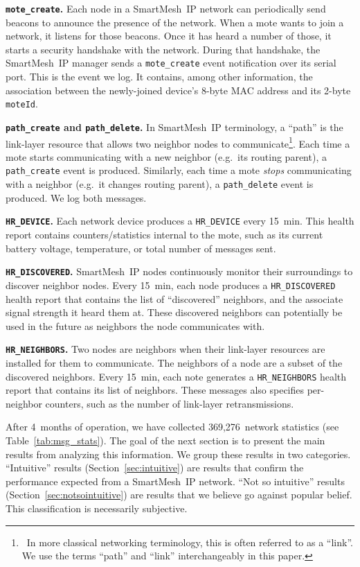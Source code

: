 \documentclass{sig-alternate}
\newcommand{\smip}                {SmartMesh~IP\xspace}
\newcommand{\HRNEIGHBORS}         {{\tt HR\_NEIGHBORS}\xspace}
\newcommand{\HRDISCOVERED}        {{\tt HR\_DISCOVERED}\xspace}
\newcommand{\HRDEVICE}            {{\tt HR\_DEVICE}\xspace}
\newcommand{\pathcreate}          {{\tt path\_create}\xspace}
\newcommand{\pathdelete}          {{\tt path\_delete}\xspace}
\newcommand{\motecreate}          {{\tt mote\_create}\xspace}
\newcommand{\moteId}              {{\tt moteId}\xspace}
\begin{document}
\textbf{\motecreate.}
Each node in a \smip network can periodically send beacons to announce the presence of the network.
When a mote wants to join a network, it listens for those beacons.
Once it has heard a number of those, it starts a security handshake with the network.
During that handshake, the \smip manager sends a \motecreate event notification over its serial port.
This is the event we log.
It contains, among other information, the association between the newly-joined device's 8-byte MAC address and its 2-byte \moteId.

\textbf{\pathcreate and \pathdelete.}
In \smip terminology, a ``path'' is the link-layer resource that allows two neighbor nodes to communicate\footnote{~In more classical networking terminology, this is often referred to as a ``link''. We use the terms ``path'' and ``link'' interchangeably in this paper.}.
Each time a mote starts communicating with a new neighbor (e.g.~its routing parent), a \pathcreate event is produced.
Similarly, each time a mote \textit{stops} communicating with a neighbor (e.g.~it changes routing parent), a \pathdelete event is produced.
We log both messages.

\textbf{\HRDEVICE.}
Each network device produces a \HRDEVICE every 15~min.
This health report contains counters/statistics internal to the mote, such as its current battery voltage, temperature, or total number of messages sent.

\textbf{\HRDISCOVERED.}
\smip nodes continuously monitor their surroundings to discover neighbor nodes.
Every 15~min, each node produces a \HRDISCOVERED health report that contains the list of ``discovered'' neighbors, and the associate signal strength it heard them at.
These discovered neighbors can potentially be used in the future as neighbors the node communicates with.

\textbf{\HRNEIGHBORS.}
Two nodes are neighbors when their link-layer resources are installed for them to communicate.
The neighbors of a node are a subset of the discovered neighbors.
Every 15~min, each note generates a \HRNEIGHBORS health report that contains its list of neighbors.
These messages also specifies per-neighbor counters, such as the number of link-layer retransmissions.


After 4~months of operation, we have collected 369,276~network statistics (see Table~\ref{tab:msg_stats}).
The goal of the next section is to present the main results from analyzing this information.
We group these results in two categories.
``Intuitive'' results (Section~\ref{sec:intuitive}) are results that confirm the performance expected from a \smip network.
``Not so intuitive'' results (Section~\ref{sec:notsointuitive}) are results that we believe go against popular belief.
This classification is necessarily subjective.
\end{document}
